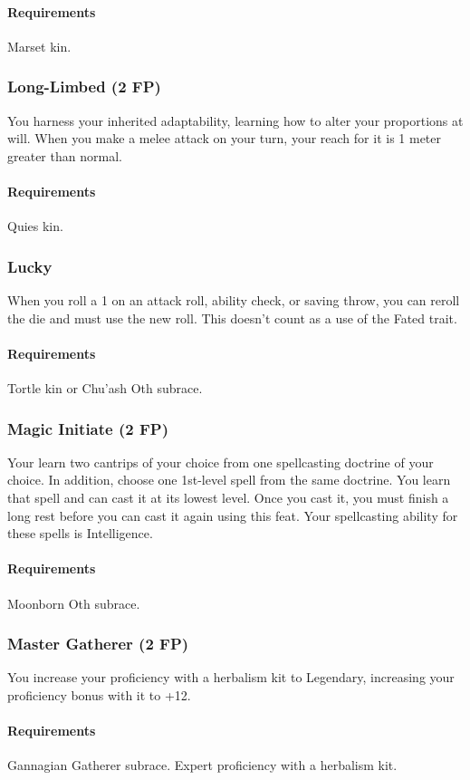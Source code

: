     \paragraph{Requirements} Marset kin.
\subsubsection{Long-Limbed (2 FP)} \label{feat::longlimbed}
    You harness your inherited adaptability, learning how to alter your proportions at will.
    When you make a melee attack on your turn, your reach for it is 1 meter greater than normal.
    \paragraph{Requirements} Quies kin.
\subsubsection{Lucky} \label{feat::lucky}
    When you roll a 1 on an attack roll, ability check, or saving throw, you can reroll the die and must use the new roll.
    This doesn't count as a use of the Fated trait.
    \paragraph{Requirements} Tortle kin or Chu'ash Oth subrace.
\subsubsection{Magic Initiate (2 FP)} \label{feat::magicinitiate}
    Your learn two cantrips of your choice from one spellcasting doctrine of your choice.
    In addition, choose one 1st-level spell from the same doctrine.
    You learn that spell and can cast it at its lowest level.
    Once you cast it, you must finish a long rest before you can cast it again using this feat.
    Your spellcasting ability for these spells is Intelligence.
    \paragraph{Requirements} Moonborn Oth subrace.
\subsubsection{Master Gatherer (2 FP)} \label{feat::mastergatherer}
    You increase your proficiency with a herbalism kit to Legendary, increasing your proficiency bonus with it to +12.
    \paragraph{Requirements} Gannagian Gatherer subrace. Expert proficiency with a herbalism kit.
